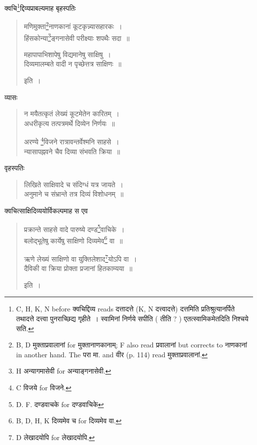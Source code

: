 \documentclass[11pt, openany]{book}
\begin{document}
क्वचि\renewcommand{\thefootnote}{3}\footnote{C, H, K, N before क्वचिद्दिव्य reads दत्तादत्ते (K, N दत्त्वादत्ते) दत्तमिति प्रतिश्रुत्यानर्पिते तथादत्ते दत्त्वा पुनराच्छिद्य गृहीते~। स्वामिनां निर्णये सपीति ( तीति ? ) एतत्स्वामिकमेतदिति निश्चये सति.}द्दिव्यप्राबल्यमाह बृहस्पतिः 

\begin{quote}
{\vy मणिमुक्ता\renewcommand{\thefootnote}{4}\footnote{B, D मुक्ताप्रवालानां for मुक्तानाणकानाम्; F also read प्रवालानां but corrects to नाणकानां in another hand. The परा मा. and वीर (p. 114) read मुक्ताप्रवालानां.}नाणकानां कूटकृन्न्यासहारकः~।\\
हिंसकोन्या\renewcommand{\thefootnote}{5}\footnote{H अन्यागमासेवी for अन्याङ्गनासेवी.}ङ्गनासेवी परीक्ष्याः शपथैः सदा~॥

महापापाभिशापेषु विद्यमानेषु साक्षिषु~।\\
दिव्यमालम्बते वादी न पृच्छेत्तत्र साक्षिणः~॥} इति~।
\end{quote}

\newpage
{}

व्यासः

\begin{quote}
{\vy न मयैतत्कृतं लेख्यं कूटमेतेन कारितम्~।\\
अधरीकृत्य तत्पत्रमर्थे दिव्येन निर्णयः~॥

अरण्ये \renewcommand{\thefootnote}{1}\footnote{C विजये for विजने.}विजने रात्रावन्तर्वेश्मनि साहसे~।\\
न्यासापह्नवने चैव दिव्या संभवति क्रिया~॥}
\end{quote}

वृहस्पतिः

\begin{quote}
{\vy लिखिते साक्षिवादे च संदिग्धं यत्र जायते~।\\
अनुमाने च संभ्रान्ते तत्र दिव्यं विशोधनम्~॥}
\end{quote}

क्वचित्साक्षिदिव्ययोर्विकल्पमाह स एव

\begin{quote}
{\vy प्रक्रान्ते साहसे वादे पारुष्ये दण्ड\renewcommand{\thefootnote}{2}\footnote{D. F. दण्डवाचके for दण्डवाचिके}वाचिके~।\\
बलोद्भूतेषु कार्येषु साक्षिणो दिव्यमेव\renewcommand{\thefootnote}{3}\footnote{B, D, H, K दिव्यमेव च for दिव्यमेव वा.} वा~॥

ऋणे लेख्यं साक्षिणो वा युक्तिलेशाद\renewcommand{\thefootnote}{4}\footnote{D लेखादयोपि for लेखादयोपि.}योऽपि वा~।\\
दैविकी वा क्रिया प्रोक्ता प्रजानां हितकाम्यया~॥} इति~।
\end{quote}
\end{document}
